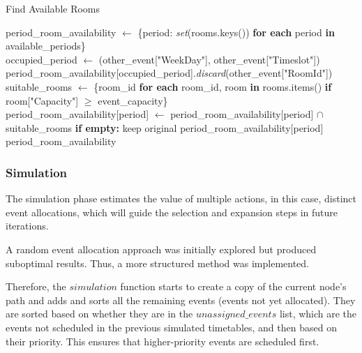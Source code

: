 \begin{algorithm}
\caption{Find Available Rooms}\label{find_available_rooms}
\begin{algorithmic}[1]
    \State period\_room\_availability $\gets$ \{period: \textit{set}(rooms.keys()) \textbf{for each} period \textbf{in} available\_periods\}
    \\
        \State occupied\_period $\gets$ (other\_event["WeekDay"], other\_event["Timeslot"])
            \State period\_room\_availability[occupied\_period].\textit{discard}(other\_event["RoomId"])
        \EndIf
    \EndFor
    \\
    \State suitable\_rooms $\gets$ \{room\_id \textbf{for each} room\_id, room \textbf{in} rooms.items() \textbf{if} room["Capacity"] $\geq$ event\_capacity\}
    \\
            \State period\_room\_availability[period] $\gets$ period\_room\_availability[period] $\cap$ suitable\_rooms 
            \State \textbf{if empty:} keep original period\_room\_availability[period]
        \EndIf
    \EndFor
    \\
    \State \Return period\_room\_availability
\EndFunction
\end{algorithmic}
\end{algorithm}

\subsubsection{Simulation}

The simulation phase estimates the value of multiple actions, in this case, distinct event allocations, which will guide the selection and expansion steps in future iterations. 

A random event allocation approach was initially explored but produced suboptimal results. Thus, a more structured method was implemented.

Therefore, the \(simulation\) function starts to create a copy of the current node's path and adds and sorts all the remaining events (events not yet allocated). They are sorted based on whether they are in the \(unassigned\_events\) list, which are the events not scheduled in the previous simulated timetables, and then based on their priority. This ensures that higher-priority events are scheduled first.

